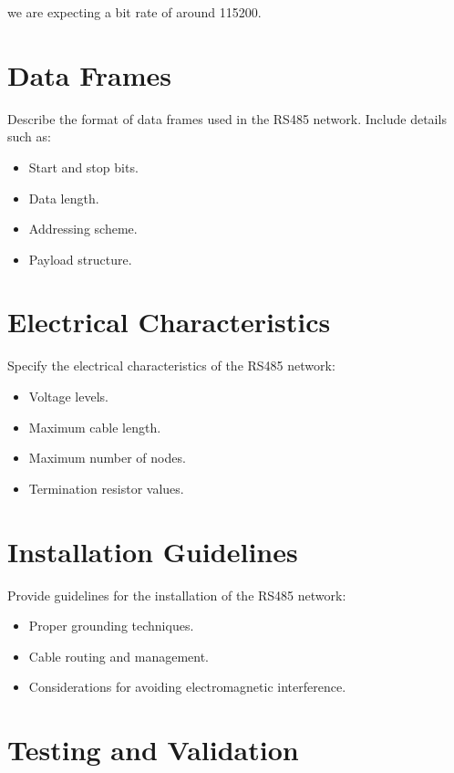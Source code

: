 \documentclass[a4paper,12pt]{article}
\begin{document}
	we are expecting a bit rate of around 115200.
	
	\section{Data Frames}
	
	Describe the format of data frames used in the RS485 network. Include details such as:
	
	\begin{itemize}[label=--]
		\item Start and stop bits.
		\item Data length.
		\item Addressing scheme.
		\item Payload structure.
	\end{itemize}
	
	\section{Electrical Characteristics}
	
	Specify the electrical characteristics of the RS485 network:
	
	\begin{itemize}[label=--]
		\item Voltage levels.
		\item Maximum cable length.
		\item Maximum number of nodes.
		\item Termination resistor values.
	\end{itemize}
	
	\section{Installation Guidelines}
	
	Provide guidelines for the installation of the RS485 network:
	
	\begin{itemize}[label=--]
		\item Proper grounding techniques.
		\item Cable routing and management.
		\item Considerations for avoiding electromagnetic interference.
	\end{itemize}
	
	\section{Testing and Validation}
	
\end{document}
